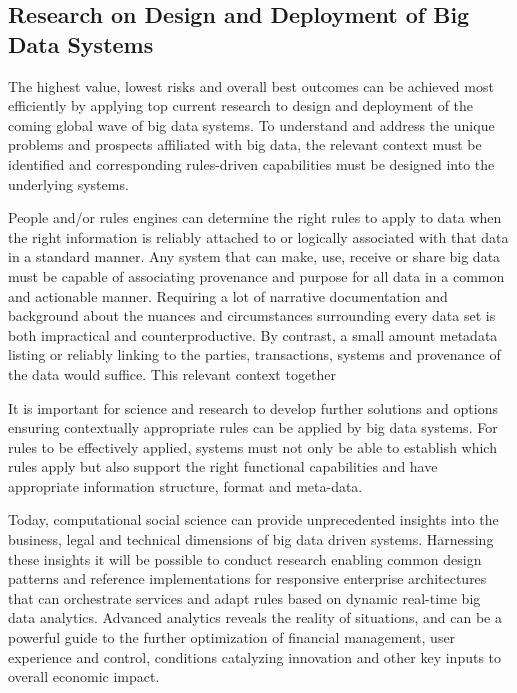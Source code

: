 \subsection{Research on Design and Deployment of Big Data Systems}

The highest value, lowest risks and overall best outcomes can be achieved most efficiently by applying top current research to design and deployment of the coming global wave of big data systems. To understand and address the unique problems and prospects affiliated with big data, the relevant context must be identified and corresponding rules-driven capabilities must be designed into the underlying systems.

People and/or rules engines can determine the right rules to apply to data when the right information is reliably attached to or logically associated with that data in a standard manner. Any system that can make, use, receive or share big data must be capable of associating provenance and purpose for all data in a common and actionable manner. Requiring a lot of narrative documentation and background about the nuances and circumstances surrounding every data set is both impractical and counterproductive. By contrast, a small amount metadata listing or reliably linking to the parties, transactions, systems and provenance of the data would suffice. This relevant context together

It is important for science and research to develop further solutions and options ensuring contextually appropriate rules can be applied by big data systems. For rules to be effectively applied, systems must not only be able to establish which rules apply but also support the right functional capabilities and have appropriate information structure, format and meta-data.

Today, computational social science can provide unprecedented insights into the business, legal and technical dimensions of big data driven systems. Harnessing these insights it will be possible to conduct research enabling common design patterns and reference implementations for responsive enterprise architectures that can orchestrate services and adapt rules based on dynamic real-time big data analytics. Advanced analytics reveals the reality of situations, and can be a powerful guide to the further optimization of financial management, user experience and control, conditions catalyzing innovation and other key inputs to overall economic impact.

